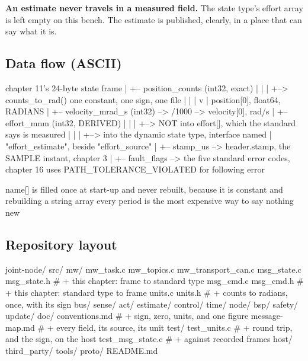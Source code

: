 \textbf{An estimate never travels in a measured field.} The state type's effort
array is left empty on this bench. The estimate is published, clearly, in a place
that can say what it is.

\subsection*{Data flow (ASCII)}

\begin{asciiart}
  chapter 11's 24-byte state frame
        |
        +-- position_counts  (int32, exact)
        |        |
        |        +--> counts_to_rad()  one constant, one sign, one file
        |                    |
        |                    v
        |              position[0], float64, RADIANS
        |
        +-- velocity_mrad_s  (int32) --> /1000 --> velocity[0], rad/s
        |
        +-- effort_mnm       (int32, DERIVED)
        |        |
        |        +--> NOT into effort[], which the standard says is measured
        |        |
        |        +--> into the dynamic state type, interface named
        |             "effort_estimate", beside "effort_source"
        |
        +-- stamp_us         --> header.stamp, the SAMPLE instant, chapter 3
        |
        +-- fault_flags      --> the five standard error codes, chapter 16 uses
                                 PATH_TOLERANCE_VIOLATED for following error

  name[] is filled once at start-up and never rebuilt, because it is constant
  and rebuilding a string array every period is the most expensive way to say
  nothing new
\end{asciiart}

\subsection*{Repository layout}

\begin{plaincode}
joint-node/
  src/
    mw/
      mw_task.c mw_topics.c mw_transport_can.c
      msg_state.c  msg_state.h     # + this chapter: frame to standard type
      msg_cmd.c    msg_cmd.h       # + this chapter: standard type to frame
      units.c      units.h         # + counts to radians, once, with its sign
    bus/ sense/ act/ estimate/ control/ time/ node/ bsp/
    safety/  update/
  doc/
    conventions.md                 # + sign, zero, units, and one figure
    message-map.md                 # + every field, its source, its unit
  test/
    test_units.c                   # + round trip, and the sign, on the host
    test_msg_state.c               # + against recorded frames
  host/  third_party/  tools/  proto/  README.md
\end{plaincode}

